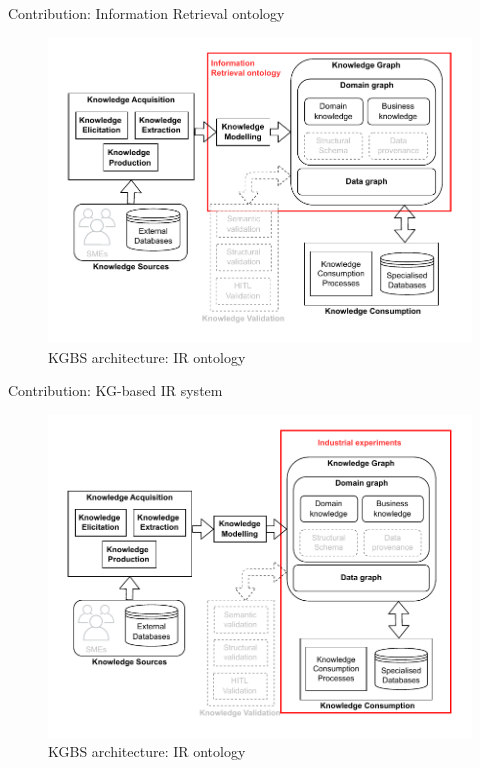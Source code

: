 \begin{frame}{Contribution: Information Retrieval ontology}

    \begin{figure} [H]
        \begin{center}
            \includegraphics[scale=0.5]{images/KGBS-knowledge-modelling-kg-IR-onto.pdf} 
            \caption{KGBS architecture: IR ontology} 
        \end{center}
    \end{figure}

\end{frame}

\begin{frame}{Contribution: KG-based IR system}

    \begin{figure} [H]
        \begin{center}
            \includegraphics[scale=0.5]{images/KGBS-knowledge-consumption-industrial-exp.pdf} 
            \caption{KGBS architecture: IR ontology} 
        \end{center}
    \end{figure}

\end{frame}

